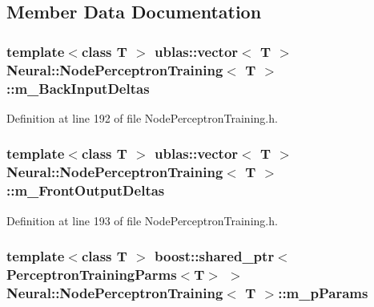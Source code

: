 \subsection{Member Data Documentation}
\hypertarget{class_neural_1_1_node_perceptron_training_a0716f11bf1c185a591ad1ac5e095bc6a}{
\subsubsection[{m\_\-BackInputDeltas}]{\setlength{\rightskip}{0pt plus 5cm}template$<$class T $>$ ublas::vector$<$ T $>$ {\bf Neural::NodePerceptronTraining}$<$ T $>$::{\bf m\_\-BackInputDeltas}}}
\label{class_neural_1_1_node_perceptron_training_a0716f11bf1c185a591ad1ac5e095bc6a}


Definition at line 192 of file NodePerceptronTraining.h.

\hypertarget{class_neural_1_1_node_perceptron_training_a91c47cf8e1f254a72568d0d7988b77d9}{
\subsubsection[{m\_\-FrontOutputDeltas}]{\setlength{\rightskip}{0pt plus 5cm}template$<$class T $>$ ublas::vector$<$ T $>$ {\bf Neural::NodePerceptronTraining}$<$ T $>$::{\bf m\_\-FrontOutputDeltas}}}
\label{class_neural_1_1_node_perceptron_training_a91c47cf8e1f254a72568d0d7988b77d9}


Definition at line 193 of file NodePerceptronTraining.h.

\hypertarget{class_neural_1_1_node_perceptron_training_a342301971ab0a2817f0bebe2dbe002b4}{
\subsubsection[{m\_\-pParams}]{\setlength{\rightskip}{0pt plus 5cm}template$<$class T $>$ boost::shared\_\-ptr$<$ {\bf PerceptronTrainingParms}$<$T$>$ $>$ {\bf Neural::NodePerceptronTraining}$<$ T $>$::{\bf m\_\-pParams}}}
\label{class_neural_1_1_node_perceptron_training_a342301971ab0a2817f0bebe2dbe002b4}


